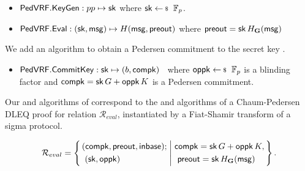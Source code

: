 \begin{itemize}
	\item ${\mathsf{PedVRF}}.{\mathsf{KeyGen}}: pp \mapsto \mathsf{sk}$  where $\sk \leftsample \F_p$. %
	\item ${\mathsf{PedVRF}}.{\mathsf{Eval}} : (\mathsf{sk},\mathsf{msg}) \mapsto H(\mathsf{msg}, {\mathsf{preout}})$ where ${\mathsf{preout}} = \mathsf{sk} \, H_{{\mathbf{G}}}(\mathsf{msg})$
\end{itemize}
\noindent We add an algorithm to obtain a Pedersen commitment to the secret key \sk.
\begin{itemize}
	\item ${\mathsf{PedVRF}}.{\mathsf{CommitKey}}: \mathsf{sk} \mapsto (b, \mathsf{compk})$ \,
	where  $\openpk \leftsample \F_p$ is a blinding factor
	and $\mathsf{compk} = \mathsf{sk} \, G + \mathsf{oppk} \, K$ is a Pedersen commitment.
\end{itemize}

Our \Sign and \Verify algorithms of \PedVRF correspond to
the \Prove and \Verify algorithms of a Chaum-Pedersen DLEQ proof
for relation $\mathcal{R}_{eval}$,
instantiated by a Fiat-Shamir transform of a sigma protocol.

$$ \mathcal{R}_{eval} = \Setst{
	\begin{aligned}
		& (\compk,\PreOut,\In) ; \\ 
		& \,\, (\sk, \openpk) 
	\end{aligned}
}{
	\begin{aligned}
		& \compk = \sk\,\genG + \openpk\,\genB, \\
		& \,\, \PreOut = \sk \, H_{\grE}(\msg) 
	\end{aligned}
}  \mathperiod \label{rel:commit} 
$$




